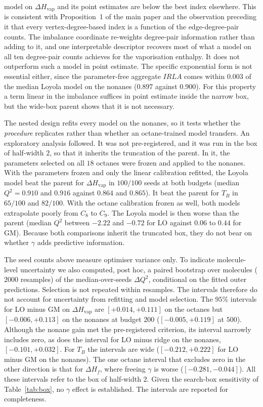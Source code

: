 \documentclass[a5paper, 10pt]{article}
\theoremstyle{plain}
\theoremstyle{remark}
\theoremstyle{definition}
\begin{document}
model on $\Delta H_{\mathrm{vap}}$ and its point estimates are below the
best index elsewhere. This is consistent with Proposition~1 of the main paper and the observation preceding it that every vertex-degree-based index is a function of the edge-degree-pair counts. The imbalance coordinate re-weights degree-pair
information rather than adding to it, and one interpretable descriptor
recovers most of what a model on all ten degree-pair counts achieves
for the vaporisation enthalpy. It does not outperform such a model in
point estimate. The
specific exponential form is not essential either, since the
parameter-free aggregate $IRLA$ comes within $0.003$ of the median
Loyola model on the nonanes ($0.897$ against $0.900$). For this
property a term linear in the imbalance suffices in point estimate inside
the narrow box, but the wide-box parent shows that it is not necessary.

The nested design refits every model on the nonanes, so it tests
whether the \emph{procedure} replicates rather than whether an
octane-trained model transfers. An exploratory analysis
followed. It was not pre-registered, and it was run in the box of
half-width $2$, so that it inherits the truncation of the parent. In
it, the parameters selected on all $18$ octanes were frozen and applied
to the nonanes. With the parameters frozen and only the linear
calibration refitted, the Loyola model beat the parent for
$\Delta H_{\mathrm{vap}}$ in $100/100$ seeds at both budgets (median
$Q^2 = 0.910$ and $0.916$ against $0.864$ and $0.865$). It beat the
parent for $T_B$ in $65/100$ and $82/100$. With the octane calibration
frozen as well, both models extrapolate poorly from $C_8$ to $C_9$. The
Loyola model is then worse than the parent (median $Q^2$ between
$-2.22$ and $-0.72$ for LO against $0.06$ to $0.44$ for GM). Because
both comparisons inherit the truncated box, they do not bear on whether
$\gamma$ adds predictive information.

The seed counts above measure optimiser variance only. To indicate
molecule-level uncertainty we also computed, post hoc, a paired
bootstrap over molecules ($2000$ resamples) of the median-over-seeds
$\Delta Q^2$, conditional on the fitted outer predictions. Selection is
not repeated within resamples. The intervals therefore do not account
for uncertainty from refitting and model selection. The $95\%$ intervals
for LO minus GM on $\Delta H_{\mathrm{vap}}$ are $[+0.014, +0.111]$ on
the octanes but $[-0.006, +0.113]$ on the nonanes at budget $200$
($[-0.005, +0.119]$ at $500$). Although the nonane gain met the
pre-registered criterion, its interval narrowly includes zero, as does
the interval for LO minus ridge on the nonanes, $[-0.101, +0.032]$.
For $T_B$ the intervals are wide ($[-0.212, +0.222]$ for LO minus GM on
the nonanes). The one octane interval that excludes zero in the other
direction is that for $\Delta H_f$, where freeing $\gamma$ is worse
($[-0.281, -0.044]$). All these intervals refer to the box of
half-width $2$. Given the search-box sensitivity of Table~\ref{tab:box}, no $\gamma$ effect
is established. The intervals are reported for
completeness.
\end{document}

